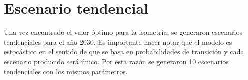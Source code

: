 \documentclass[12pt,a4paper,oldfontcommands]{article}
\begin{document}
\section{Escenario tendencial}
Una vez encontrado el valor óptimo para la isometría, se generaron escenarios tendenciales para el año 2030. Es importante hacer notar que el modelo es estocástico en el sentido de que se basa en probabilidades de transición y cada escenario producido será único. Por esta razón se generaron 10 escenarios tendenciales con los mismos parámetros.


\newpage
\printbibliography
\end{document}
